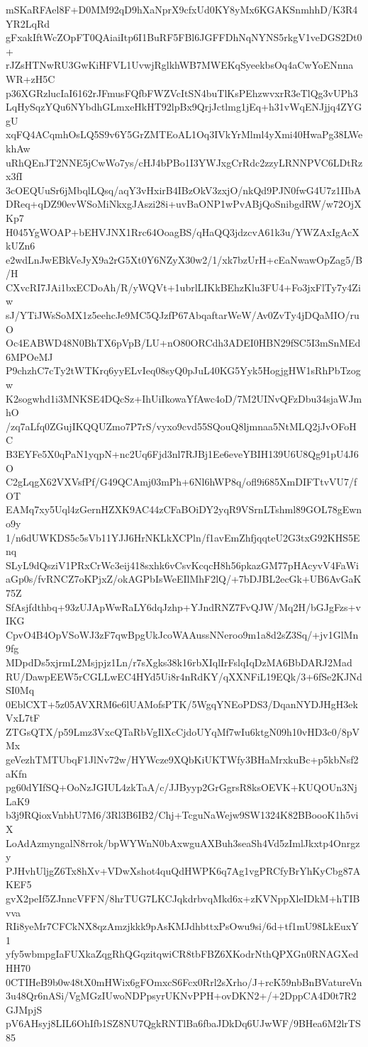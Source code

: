 mSKaRFAel8F+D0MM92qD9hXaNprX9cfxUd0KY8yMx6KGAKSnmhhD/K3R4YR2LqRd
gFxakIftWcZOpFT0QAiaiItp6I1BuRF5FBl6JGFFDhNqNYNS5rkgV1veDGS2Dt0+
rJZsHTNwRU3GwKiHFVL1UvwjRglkhWB7MWEKqSyeekbsOq4aCwYoENnnaWR+zH5C
p36XGRzlucIaI6162rJFmusFQfbFWZVcItSN4buTlKsPEhzwvxrR3eTlQg3vUPh3
LqHySqzYQu6NYbdhGLmxeHkHT92lpBx9QrjJctlmg1jEq+h31vWqENJjjq4ZYGgU
xqFQ4ACqmhOsLQ5S9v6Y5GrZMTEoAL1Oq3IVkYrMlml4yXmi40HwaPg38LWekhAw
uRhQEnJT2NNE5jCwWo7ys/cHJ4bPBo1I3YWJxgCrRdc2zzyLRNNPVC6LDtRzx3fI
3cOEQUuSr6jMbqlLQsq/aqY3vHxirB4IBzOkV3zxjO/nkQd9PJN0fwG4U7z1IIbA
DReq+qDZ90evWSoMiNkxgJAszi28i+uvBaONP1wPvABjQoSnibgdRW/w72OjXKp7
H045YgWOAP+bEHVJNX1Rrc64OoagBS/qHaQQ3jdzcvA61k3u/YWZAxIgAcXkUZn6
e2wdLnJwEBkVeJyX9a2rG5Xt0Y6NZyX30w2/1/xk7bzUrH+cEaNwawOpZag5/B/H
CXvcRI7JAi1bxECDoAh/R/yWQVt+1ubrlLIKkBEhzKlu3FU4+Fo3jxFlTy7y4Ziw
sJ/YTiJWsSoMX1z5eehcJe9MC5QJzfP67AbqaftarWeW/Av0ZvTy4jDQaMIO/ruO
Oc4EABWD48N0BhTX6pVpB/LU+nO80ORCdh3ADEI0HBN29fSC5I3mSnMEd6MPOeMJ
P9chzhC7cTy2tWTKrq6yyELvIeq08syQ0pJuL40KG5Yyk5HogjgHW1sRhPbTzogw
K2sogwhd1i3MNKSE4DQcSz+IhUiIkowaYfAwc4oD/7M2UINvQFzDbu34sjaWJmhO
/zq7aLfq0ZGujIKQQUZmo7P7rS/vyxo9cvd55SQouQ8ljmnaa5NtMLQ2jJvOFoHC
B3EYFe5X0qPaN1yqpN+nc2Uq6Fjd3nl7RJBj1Ee6eveYBIH139U6U8Qg91pU4J6O
C2gLqgX62VXVsfPf/G49QCAmj03mPh+6Nl6hWP8q/ofl9i685XmDIFTtvVU7/fOT
EAMq7xy5Uql4zGernHZXK9AC44zCFaBOiDY2yqR9VSrnLTshml89GOL78gEwno9y
1/n6dUWKDS5c5sVb11YJJ6HrNKLkXCPln/f1avEmZhfjqqteU2G3txG92KHS5Enq
SLyL9dQsziV1PRxCrWc3eij418sxhk6vCsvKcqcH8h56pkazGM77pHAcyvV4FaWi
aGp0s/fvRNCZ7oKPjxZ/okAGPbIsWeEIlMhF2lQ/+7bDJBL2ecGk+UB6AvGaK75Z
SfAsjfdthbq+93zUJApWwRaLY6dqJzhp+YJndRNZ7FvQJW/Mq2H/bGJgFzs+vIKG
CpvO4B4OpVSoWJ3zF7qwBpgUkJcoWAAussNNeroo9m1a8d2sZ3Sq/+jv1GlMn9fg
MDpdDs5xjrmL2Msjpjz1Ln/r7sXgks38k16rbXIqlIrFslqIqDzMA6BbDARJ2Mad
RU/DawpEEW5rCGLLwEC4HYd5Ui8r4nRdKY/qXXNFiL19EQk/3+6fSe2KJNdSI0Mq
0EblCXT+5z05AVXRM6e6lUAMofsPTK/5WgqYNEoPDS3/DqanNYDJHgH3ekVxL7tF
ZTGsQTX/p59Lmz3VxcQTaRbVgIlXcCjdoUYqMf7wIu6ktgN09h10vHD3c0/8pVMx
geVezhTMTUbqF1JlNv72w/HYWcze9XQbKiUKTWfy3BHaMrxkuBc+p5kbNsf2aKfn
pg60dYIfSQ+OoNzJGIUL4zkTaA/c/JJByyp2GrGgrsR8ksOEVK+KUQOUn3NjLaK9
b3j9RQioxVnbhU7M6/3Rl3B6IB2/Chj+TcguNaWejw9SW1324K82BBoooK1h5viX
LoAdAzmyngalN8rrok/bpWYWnN0bAxwguAXBuh3seaSh4Vd5zImlJkxtp4Onrgzy
PJHvhUljgZ6Tx8hXv+VDwXshot4quQdHWPK6q7Ag1vgPRCfyBrYhKyCbg87AKEF5
gvX2peIf5ZJnncVFFN/8hrTUG7LKCJqkdrbvqMkd6x+zKVNppXleIDkM+hTIBvva
RIi8yeMr7CFCkNX8qzAmzjkkk9pAsKMJdhbttxPsOwu9si/6d+tf1mU98LkEuxY1
yfy5wbmpgIaFUXkaZqgRhQGqzitqwiCR8tbFBZ6XKodrNthQPXGn0RNAGXedHH70
0CTIHeB9b0w48tX0mHWix6gFOmxcS6Fcx0Rrl2sXrho/J+rcK59nbBnBVatureVn
3u48Qr6nASi/VgMGzIUwoNDPpsyrUKNvPPH+ovDKN2+/+2DppCA4D0t7R2GJMpjS
pV6AHsyj8LIL6OhIfb1SZ8NU7QgkRNTlBa6fbaJDkDq6UJwWF/9BHea6M2lrTS85
